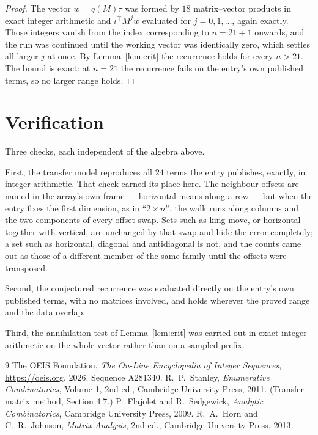 \documentclass[11pt,a4paper]{article}
\theoremstyle{plain}
\theoremstyle{definition}
\begin{document}
\begin{proof}
The vector $w=q(M)\tau$ was formed by $18$ matrix--vector products in exact integer
arithmetic and $\iota^{\!\top}M^{j}w$ evaluated for $j=0,1,\dots$, again exactly. Those
integers vanish from the index corresponding to $n=21+1$ onwards, and the run was
continued until the working vector was identically zero, which settles all larger $j$ at once.
By Lemma~\ref{lem:crit} the recurrence holds for every $n>21$. The bound is exact: at $n=21$ the recurrence fails on the entry's own published terms, so no larger range holds.
\end{proof}

\section{Verification}

Three checks, each independent of the algebra above.

First, the transfer model reproduces all $24$ terms the entry publishes, exactly, in
integer arithmetic. That check earned its place here. The neighbour offsets are named in the
array's own frame --- horizontal means along a row --- but when the entry fixes the first
dimension, as in ``$2\times n$'', the walk runs along columns and the two components of every
offset swap. Sets such as king-move, or horizontal together with vertical, are unchanged by
that swap and hide the error completely; a set such as horizontal, diagonal and antidiagonal
is not, and the counts came out as those of a different member of the same family until the
offsets were transposed.

Second, the conjectured recurrence was evaluated directly on the entry's own published terms,
with no matrices involved, and holds wherever the proved range and the data overlap.

Third, the annihilation test of Lemma~\ref{lem:crit} was carried out in exact integer
arithmetic on the whole vector rather than on a sampled prefix.

\begin{thebibliography}{9}
 The OEIS Foundation, \emph{The On-Line Encyclopedia of Integer
Sequences}, \url{https://oeis.org}, 2026. Sequence A281340.
 R.~P.~Stanley, \emph{Enumerative Combinatorics}, Volume 1, 2nd ed.,
Cambridge University Press, 2011. (Transfer-matrix method, Section 4.7.)
 P.~Flajolet and R.~Sedgewick, \emph{Analytic Combinatorics}, Cambridge
University Press, 2009.
 R.~A.~Horn and C.~R.~Johnson, \emph{Matrix Analysis}, 2nd ed., Cambridge
University Press, 2013.
\end{thebibliography}
\end{document}
